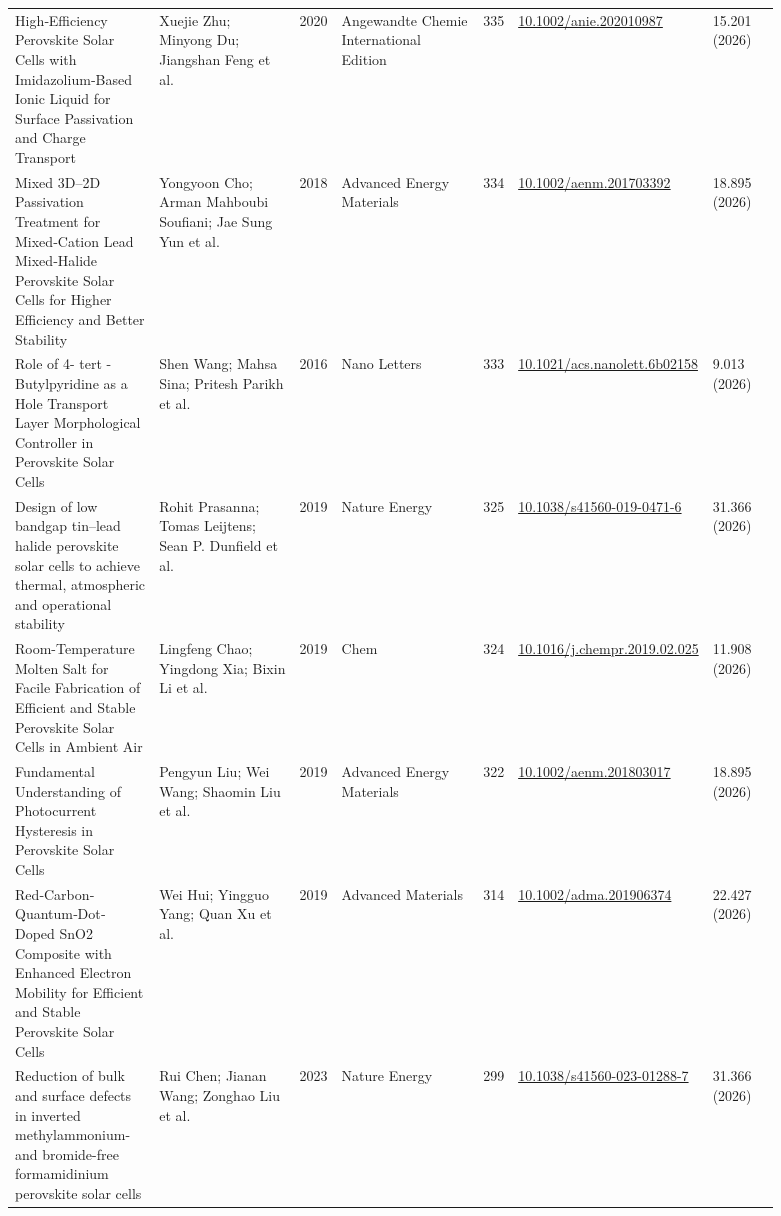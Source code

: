 \documentclass[10pt,a4paper]{article}
\begin{document}
{\begin{longtable}{p{0.197\linewidth}p{0.197\linewidth}p{0.043\linewidth}p{0.197\linewidth}p{0.043\linewidth}p{0.117\linewidth}p{0.098\linewidth}}
High‐Efficiency Perovskite Solar Cells with Imidazolium‐Based Ionic Liquid for Surface Passivation and Charge Transport & Xuejie Zhu; Minyong Du; Jiangshan Feng et al. & 2020 & Angewandte Chemie International Edition & 335 & \href{https://doi.org/10.1002/anie.202010987}{10.1002/anie.202010987} & 15.201 (2026) \\
Mixed 3D–2D Passivation Treatment for Mixed‐Cation Lead Mixed‐Halide Perovskite Solar Cells for Higher Efficiency and Better Stability & Yongyoon Cho; Arman Mahboubi Soufiani; Jae Sung Yun et al. & 2018 & Advanced Energy Materials & 334 & \href{https://doi.org/10.1002/aenm.201703392}{10.1002/aenm.201703392} & 18.895 (2026) \\
Role of 4- tert -Butylpyridine as a Hole Transport Layer Morphological Controller in Perovskite Solar Cells & Shen Wang; Mahsa Sina; Pritesh Parikh et al. & 2016 & Nano Letters & 333 & \href{https://doi.org/10.1021/acs.nanolett.6b02158}{10.1021/acs.nanolett.6b02158} & 9.013 (2026) \\
Design of low bandgap tin–lead halide perovskite solar cells to achieve thermal, atmospheric and operational stability & Rohit Prasanna; Tomas Leijtens; Sean P. Dunfield et al. & 2019 & Nature Energy & 325 & \href{https://doi.org/10.1038/s41560-019-0471-6}{10.1038/s41560-019-0471-6} & 31.366 (2026) \\
Room-Temperature Molten Salt for Facile Fabrication of Efficient and Stable Perovskite Solar Cells in Ambient Air & Lingfeng Chao; Yingdong Xia; Bixin Li et al. & 2019 & Chem & 324 & \href{https://doi.org/10.1016/j.chempr.2019.02.025}{10.1016/j.chempr.2019.02.025} & 11.908 (2026) \\
Fundamental Understanding of Photocurrent Hysteresis in Perovskite Solar Cells & Pengyun Liu; Wei Wang; Shaomin Liu et al. & 2019 & Advanced Energy Materials & 322 & \href{https://doi.org/10.1002/aenm.201803017}{10.1002/aenm.201803017} & 18.895 (2026) \\
Red‐Carbon‐Quantum‐Dot‐Doped SnO2 Composite with Enhanced Electron Mobility for Efficient and Stable Perovskite Solar Cells & Wei Hui; Yingguo Yang; Quan Xu et al. & 2019 & Advanced Materials & 314 & \href{https://doi.org/10.1002/adma.201906374}{10.1002/adma.201906374} & 22.427 (2026) \\
Reduction of bulk and surface defects in inverted methylammonium- and bromide-free formamidinium perovskite solar cells & Rui Chen; Jianan Wang; Zonghao Liu et al. & 2023 & Nature Energy & 299 & \href{https://doi.org/10.1038/s41560-023-01288-7}{10.1038/s41560-023-01288-7} & 31.366 (2026) \\

\end{longtable}}
\end{document}
